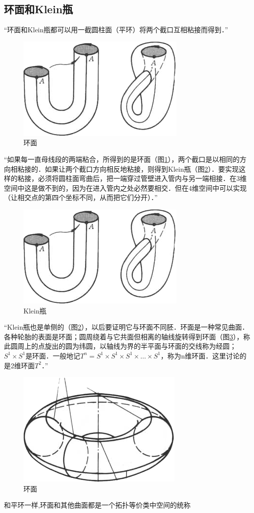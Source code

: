 \subsection*{环面和Klein瓶}
“环面和Klein瓶都可以用一截圆柱面（平环）将两个截口互相粘接而得到．”
\begin{figure}[H]
    \centering
    \includegraphics[width=0.5\linewidth]{image_3.png}
    \caption{环面}
    \label{fig:enter-label_3}
\end{figure}
“如果每一直母线段的两端粘合，所得到的是环面（图\ref{fig:enter-label_3}），两个截口是以相同的方向相粘接的．如果让两个截口方向相反地粘接，则得到Klein瓶（图\ref{fig:enter-label_4}）．要实现这样的粘接，必须将圆柱面弯曲后，把一端穿过管壁进入管内与另一端相接．在3维空间中这是做不到的，因为在进入管内之处必然要相交．但在4维空间中可以实现（让相交点的第四个坐标不同，从而把它们分开）．”
\begin{figure}[H]
    \centering
    \includegraphics[width=0.5\linewidth]{image_3.png}
    \caption{Klein瓶}
    \label{fig:enter-label_4}
\end{figure}
“Klein瓶也是单侧的（图\ref{fig:enter-label_4}），以后要证明它与环面不同胚．环面是一种常见曲面．各种轮胎的表面是环面；圆周绕着与它共面但相离的轴线旋转得到环面（图\ref{fig:enter-label_5}），称此圆周上的点旋出的圆为纬圆，以轴线为界的半平面与环面的交线称为经圆；\(S^1 \times S^1\)是环面．一般地记\(T^n =S^1 \times S^1 \times S^1 \times \dots \times S^1\)，称为n维环面．这里讨论的是2维环面\(T^2\)．”
\begin{figure}[H]
    \centering
    \includegraphics[width=0.5\linewidth]{image_5.png}
    \caption{环面}
    \label{fig:enter-label_5}
\end{figure}
和平环一样,环面和其他曲面都是一个拓扑等价类中空间的统称

